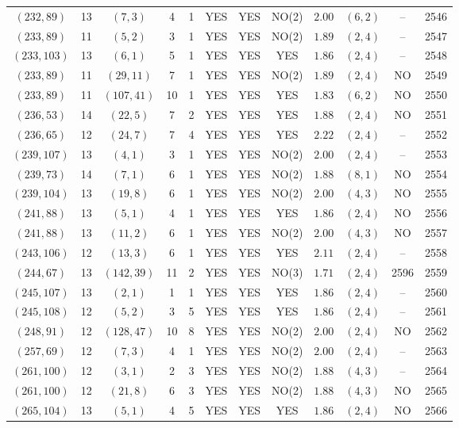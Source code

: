 \begin{longtable}{|c|c|c|c|c|c|c|c|c|c|c|c|}
$(232,89)$ & 13 & $(7,3)$ & 4 & 1 & YES & YES & NO(2) & $2.00$ & $(6,2)$ & -- & 2546\\
$(233,89)$ & 11 & $(5,2)$ & 3 & 1 & YES & YES & NO(2) & $1.89$ & $(2,4)$ & -- & 2547\\
$(233,103)$ & 13 & $(6,1)$ & 5 & 1 & YES & YES & YES & $1.86$ & $(2,4)$ & -- & 2548\\
$(233,89)$ & 11 & $(29,11)$ & 7 & 1 & YES & YES & NO(2) & $1.89$ & $(2,4)$ & NO & 2549\\
$(233,89)$ & 11 & $(107,41)$ & 10 & 1 & YES & YES & YES & $1.83$ & $(6,2)$ & NO & 2550\\
$(236,53)$ & 14 & $(22,5)$ & 7 & 2 & YES & YES & YES & $1.88$ & $(2,4)$ & NO & 2551\\
$(236,65)$ & 12 & $(24,7)$ & 7 & 4 & YES & YES & YES & $2.22$ & $(2,4)$ & -- & 2552\\
$(239,107)$ & 13 & $(4,1)$ & 3 & 1 & YES & YES & NO(2) & $2.00$ & $(2,4)$ & -- & 2553\\
$(239,73)$ & 14 & $(7,1)$ & 6 & 1 & YES & YES & NO(2) & $1.88$ & $(8,1)$ & NO & 2554\\
$(239,104)$ & 13 & $(19,8)$ & 6 & 1 & YES & YES & NO(2) & $2.00$ & $(4,3)$ & NO & 2555\\
$(241,88)$ & 13 & $(5,1)$ & 4 & 1 & YES & YES & YES & $1.86$ & $(2,4)$ & NO & 2556\\
$(241,88)$ & 13 & $(11,2)$ & 6 & 1 & YES & YES & NO(2) & $2.00$ & $(4,3)$ & NO & 2557\\
$(243,106)$ & 12 & $(13,3)$ & 6 & 1 & YES & YES & YES & $2.11$ & $(2,4)$ & -- & 2558\\
$(244,67)$ & 13 & $(142,39)$ & 11 & 2 & YES & YES & NO(3) & $1.71$ & $(2,4)$ & 2596 & 2559\\
$(245,107)$ & 13 & $(2,1)$ & 1 & 1 & YES & YES & YES & $1.86$ & $(2,4)$ & -- & 2560\\
$(245,108)$ & 12 & $(5,2)$ & 3 & 5 & YES & YES & YES & $1.86$ & $(2,4)$ & -- & 2561\\
$(248,91)$ & 12 & $(128,47)$ & 10 & 8 & YES & YES & NO(2) & $2.00$ & $(2,4)$ & NO & 2562\\
$(257,69)$ & 12 & $(7,3)$ & 4 & 1 & YES & YES & NO(2) & $2.00$ & $(2,4)$ & -- & 2563\\
$(261,100)$ & 12 & $(3,1)$ & 2 & 3 & YES & YES & NO(2) & $1.88$ & $(4,3)$ & -- & 2564\\
$(261,100)$ & 12 & $(21,8)$ & 6 & 3 & YES & YES & NO(2) & $1.88$ & $(4,3)$ & NO & 2565\\
$(265,104)$ & 13 & $(5,1)$ & 4 & 5 & YES & YES & YES & $1.86$ & $(2,4)$ & NO & 2566\\

\end{longtable}
